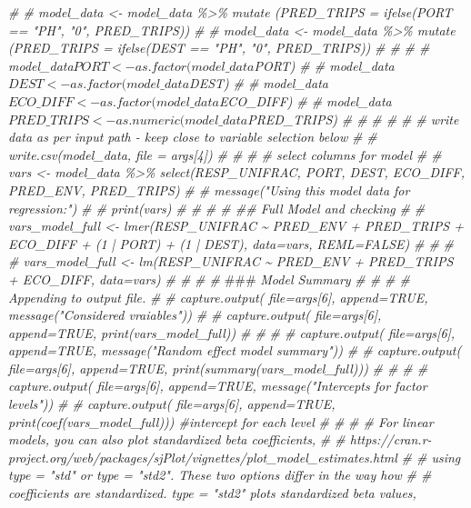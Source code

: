 \documentclass[
]{article}
\newenvironment{Shaded}{\begin{snugshade}}{\end{snugshade}}
\newcommand{\AlertTok}[1]{\textcolor[rgb]{0.94,0.16,0.16}{#1}}
\newcommand{\CommentTok}[1]{\textcolor[rgb]{0.56,0.35,0.01}{\textit{#1}}}
\begin{document}
\begin{Shaded}
\begin{Highlighting}[]
\CommentTok{\# \# model\_data <{-} model\_data \%>\% mutate (PRED\_TRIPS = ifelse(PORT  == "PH", "0", PRED\_TRIPS))}
\CommentTok{\# \# model\_data <{-} model\_data \%>\% mutate (PRED\_TRIPS = ifelse(DEST  == "PH", "0", PRED\_TRIPS))}
\CommentTok{\# \# }
\CommentTok{\# \# model\_data$PORT <{-} as.factor(model\_data$PORT)}
\CommentTok{\# \# model\_data$DEST <{-} as.factor(model\_data$DEST)}
\CommentTok{\# \# model\_data$ECO\_DIFF <{-} as.factor(model\_data$ECO\_DIFF)}
\CommentTok{\# \# model\_data$PRED\_TRIPS <{-} as.numeric(model\_data$PRED\_TRIPS)}
\CommentTok{\# \# }
\CommentTok{\# \# }
\CommentTok{\# \# write data as per input path {-} keep close to variable selection below}
\CommentTok{\# \# write.csv(model\_data, file = args[4])}
\CommentTok{\# \# }
\CommentTok{\# \# select  columns for model}
\CommentTok{\# \# vars <{-} model\_data \%>\% select(RESP\_UNIFRAC, PORT, DEST, ECO\_DIFF, PRED\_ENV, PRED\_TRIPS)}
\CommentTok{\# \# message("Using this model data for regression:")}
\CommentTok{\# \# print(vars)}
\CommentTok{\# \# }
\CommentTok{\# \# \textquotesingle{} \#\# Full Model and checking }
\CommentTok{\# \# vars\_model\_full <{-} lmer(RESP\_UNIFRAC \textasciitilde{} PRED\_ENV + PRED\_TRIPS + ECO\_DIFF + (1 | PORT) + (1 | DEST), data=vars, REML=FALSE)}
\CommentTok{\# \# }
\CommentTok{\# \# vars\_model\_full <{-} lm(RESP\_UNIFRAC \textasciitilde{} PRED\_ENV + PRED\_TRIPS + ECO\_DIFF, data=vars)}
\CommentTok{\# \# }
\CommentTok{\# \# \textquotesingle{} }\AlertTok{\#\#\#}\CommentTok{ Model Summary}
\CommentTok{\# \# }
\CommentTok{\# \# Appending to output file.}
\CommentTok{\# \# capture.output( file=args[6], append=TRUE,   message("Considered vraiables"))}
\CommentTok{\# \# capture.output( file=args[6], append=TRUE,   print(vars\_model\_full))}
\CommentTok{\# \#   }
\CommentTok{\# \# capture.output( file=args[6], append=TRUE,   message("Random effect model summary"))}
\CommentTok{\# \# capture.output( file=args[6], append=TRUE,   print(summary(vars\_model\_full)))}
\CommentTok{\# \#   }
\CommentTok{\# \# capture.output( file=args[6], append=TRUE,  message("Intercepts for factor levels"))}
\CommentTok{\# \# capture.output( file=args[6], append=TRUE,  print(coef(vars\_model\_full))) \#intercept for each level}
\CommentTok{\# \# }
\CommentTok{\# \# For linear models, you can also plot standardized beta coefficients,}
\CommentTok{\# \# https://cran.r{-}project.org/web/packages/sjPlot/vignettes/plot\_model\_estimates.html}
\CommentTok{\# \# using type = "std" or type = "std2". These two options differ in the way how}
\CommentTok{\# \# coefficients are standardized. type = "std2" plots standardized beta values,}

\end{Highlighting}
\end{Shaded}
\end{document}
